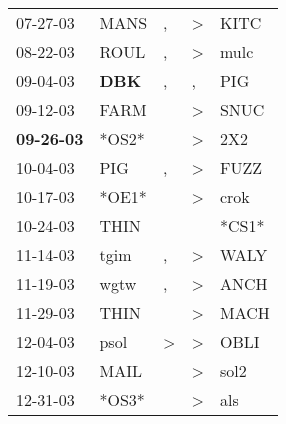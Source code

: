 \begin{supertabular}{p{0.07\textwidth}p{0.06\textwidth}p{0.02\textwidth}p{0.02\textwidth}p{0.06\textwidth}}
          07-27-03\textsuperscript{} &           MANS\textsuperscript{} &                , &     \textgreater &           KITC\textsuperscript{} \\
          08-22-03\textsuperscript{} &           ROUL\textsuperscript{} &                , &     \textgreater &           mulc\textsuperscript{} \\
          09-04-03\textsuperscript{} &   \textbf{DBK\textsuperscript{}} &                , &                , &            PIG\textsuperscript{} \\
          09-12-03\textsuperscript{} &           FARM\textsuperscript{} &                  &     \textgreater &           SNUC\textsuperscript{} \\
 \textbf{09-26-03\textsuperscript{}} &                            *OS2* &                  &     \textgreater &            2X2\textsuperscript{} \\
          10-04-03\textsuperscript{} &            PIG\textsuperscript{} &                , &     \textgreater &           FUZZ\textsuperscript{} \\
          10-17-03\textsuperscript{} &                            *OE1* &                  &     \textgreater &           crok\textsuperscript{} \\
          10-24-03\textsuperscript{} &           THIN\textsuperscript{} &                  &                  &                            *CS1* \\
          11-14-03\textsuperscript{} &           tgim\textsuperscript{} &                , &     \textgreater &           WALY\textsuperscript{} \\
          11-19-03\textsuperscript{} &           wgtw\textsuperscript{} &                , &     \textgreater &           ANCH\textsuperscript{} \\
          11-29-03\textsuperscript{} &           THIN\textsuperscript{} &                  &     \textgreater &           MACH\textsuperscript{} \\
          12-04-03\textsuperscript{} &           psol\textsuperscript{} &     \textgreater &     \textgreater &           OBLI\textsuperscript{} \\
          12-10-03\textsuperscript{} &           MAIL\textsuperscript{} &                  &     \textgreater &           sol2\textsuperscript{} \\
          12-31-03\textsuperscript{} &                            *OS3* &                  &     \textgreater &            als\textsuperscript{} \\

\end{supertabular}
